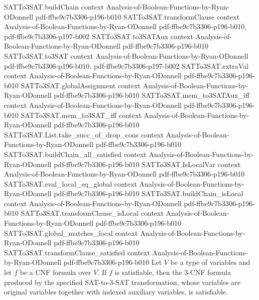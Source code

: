 \begin{theorem}
\proofstep
  {SATTo3SAT.buildChain}
  {context}
  {Analysis-of-Boolean-Functions-by-Ryan-ODonnell}
  {pdf-ffbe9c7b3306-p196-b010}
\proofstep
  {SATTo3SAT.transformClause}
  {context}
  {Analysis-of-Boolean-Functions-by-Ryan-ODonnell}
  {pdf-ffbe9c7b3306-p196-b010,
    pdf-ffbe9c7b3306-p197-b002}
\proofstep
  {SATTo3SAT.to3SATAux}
  {context}
  {Analysis-of-Boolean-Functions-by-Ryan-ODonnell}
  {pdf-ffbe9c7b3306-p196-b010}
\proofstep
  {SATTo3SAT.to3SAT}
  {context}
  {Analysis-of-Boolean-Functions-by-Ryan-ODonnell}
  {pdf-ffbe9c7b3306-p196-b010,
    pdf-ffbe9c7b3306-p197-b002}
\proofstep
  {SATTo3SAT.extraVal}
  {context}
  {Analysis-of-Boolean-Functions-by-Ryan-ODonnell}
  {pdf-ffbe9c7b3306-p196-b010}
\proofstep
  {SATTo3SAT.globalAssignment}
  {context}
  {Analysis-of-Boolean-Functions-by-Ryan-ODonnell}
  {pdf-ffbe9c7b3306-p196-b010}
\proofstep
  {SATTo3SAT.mem_to3SATAux_iff}
  {context}
  {Analysis-of-Boolean-Functions-by-Ryan-ODonnell}
  {pdf-ffbe9c7b3306-p196-b010}
\proofstep
  {SATTo3SAT.mem_to3SAT_iff}
  {context}
  {Analysis-of-Boolean-Functions-by-Ryan-ODonnell}
  {pdf-ffbe9c7b3306-p196-b010}
\proofstep
  {SATTo3SAT.List.take_succ_of_drop_cons}
  {context}
  {Analysis-of-Boolean-Functions-by-Ryan-ODonnell}
  {pdf-ffbe9c7b3306-p196-b010}
\proofstep
  {SATTo3SAT.buildChain_all_satisfied}
  {context}
  {Analysis-of-Boolean-Functions-by-Ryan-ODonnell}
  {pdf-ffbe9c7b3306-p196-b010}
\proofstep
  {SATTo3SAT.IsLocalVar}
  {context}
  {Analysis-of-Boolean-Functions-by-Ryan-ODonnell}
  {pdf-ffbe9c7b3306-p196-b010}
\proofstep
  {SATTo3SAT.eval_local_eq_global}
  {context}
  {Analysis-of-Boolean-Functions-by-Ryan-ODonnell}
  {pdf-ffbe9c7b3306-p196-b010}
\proofstep
  {SATTo3SAT.buildChain_isLocal}
  {context}
  {Analysis-of-Boolean-Functions-by-Ryan-ODonnell}
  {pdf-ffbe9c7b3306-p196-b010}
\proofstep
  {SATTo3SAT.transformClause_isLocal}
  {context}
  {Analysis-of-Boolean-Functions-by-Ryan-ODonnell}
  {pdf-ffbe9c7b3306-p196-b010}
\proofstep
  {SATTo3SAT.global_matches_local}
  {context}
  {Analysis-of-Boolean-Functions-by-Ryan-ODonnell}
  {pdf-ffbe9c7b3306-p196-b010}
\proofstep
  {SATTo3SAT.transformClause_satisfied}
  {context}
  {Analysis-of-Boolean-Functions-by-Ryan-ODonnell}
  {pdf-ffbe9c7b3306-p196-b010}
Let $V$ be a type of variables and let $f$ be a CNF formula over $V$. If $f$ is
satisfiable, then the 3-CNF formula produced by the specified SAT-to-3-SAT
transformation, whose variables are original variables together with indexed auxiliary
variables, is satisfiable.
\end{theorem}

